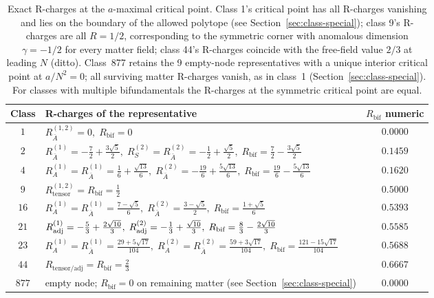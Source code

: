 \begin{table}[h]
  \centering
  \small
  \begin{tabular}{clc}
    \toprule
    Class & R-charges of the representative & $R_{\text{bif}}$ numeric \\
    \midrule
    $1$  & $R_{\bar A}^{(1,2)}=0,\;R_{\text{bif}}=0$                                                      & $0.0000$ \\[2pt]
    $2$  & $R_{\bar A}^{(1)}=-\tfrac{7}{2}+\tfrac{3\sqrt 5}{2},\;
            R_{S}^{(2)}\!=R_{\bar A}^{(2)}=-\tfrac{1}{2}+\tfrac{\sqrt 5}{2},\;
            R_{\text{bif}}=\tfrac{7}{2}-\tfrac{3\sqrt 5}{2}$              & $0.1459$ \\[2pt]
    $4$  & $R_{A}^{(1)}\!=R_{\bar A}^{(1)}=\tfrac{1}{6}+\tfrac{\sqrt{13}}{6},\;
            R_{\bar A}^{(2)}=-\tfrac{19}{6}+\tfrac{5\sqrt{13}}{6},\;
            R_{\text{bif}}=\tfrac{19}{6}-\tfrac{5\sqrt{13}}{6}$            & $0.1620$ \\[2pt]
    $9$  & $R_{\text{tensor}}^{(1,2)}=R_{\text{bif}}=\tfrac{1}{2}$                                              & $0.5000$ \\[2pt]
    $16$ & $R_{A}^{(1)}\!=R_{\bar A}^{(1)}=\tfrac{7-\sqrt 5}{6},\;
            R_{\bar A}^{(2)}=\tfrac{3-\sqrt 5}{2},\;
            R_{\text{bif}}=\tfrac{1+\sqrt 5}{6}$                           & $0.5393$ \\[2pt]
    $21$ & $R_{\mathrm{adj}}^{(1)}=-\tfrac{5}{3}+\tfrac{2\sqrt{10}}{3},\;
            R_{\mathrm{adj}}^{(2)}=-\tfrac{1}{3}+\tfrac{\sqrt{10}}{3},\;
            R_{\text{bif}}=\tfrac{8}{3}-\tfrac{2\sqrt{10}}{3}$             & $0.5585$ \\[2pt]
    $23$ & $R_{A}^{(1)}\!=R_{\bar A}^{(1)}=\tfrac{29+5\sqrt{17}}{104},\;
            R_{A}^{(2)}\!=R_{\bar A}^{(2)}=\tfrac{59+3\sqrt{17}}{104},\;
            R_{\text{bif}}=\tfrac{121-15\sqrt{17}}{104}$                   & $0.5688$ \\[2pt]
    $44$ & $R_{\text{tensor/adj}}=R_{\text{bif}}=\tfrac{2}{3}$                                           & $0.6667$ \\[2pt]
    $877$& empty node; $R_{\text{bif}}=0$ on remaining matter (see Section~\ref{sec:class-special})           & $0.0000$ \\
    \bottomrule
  \end{tabular}
  \caption{Exact R-charges at the $a$-maximal critical point.  Class
    1's critical point has all R-charges vanishing and lies on the
    boundary of the allowed polytope (see
    Section~\ref{sec:class-special}); class 9's R-charges are all
    $R=1/2$, corresponding to the symmetric corner with anomalous
    dimension $\gamma=-1/2$ for every matter field; class 44's
    R-charges coincide with the free-field value $2/3$ at leading $N$
    (ditto).  Class~877 retains the 9 empty-node representatives with
    a unique interior critical point at $a/N^{2}=0$; all surviving
    matter R-charges vanish, as in class~1
    (Section~\ref{sec:class-special}).  For classes with multiple
    bifundamentals the R-charges at the symmetric critical point are
    equal.}
  \label{tab:R-charges}
\end{table}

